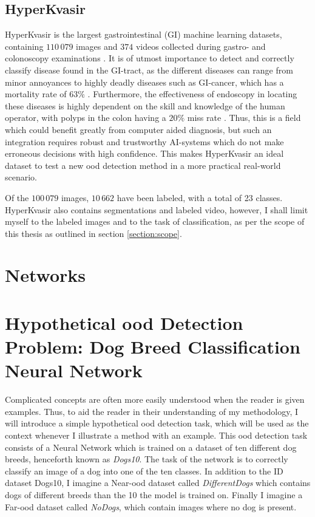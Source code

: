 \documentclass[UKenglish]{uiomasterthesis} %
\theoremstyle{definition}
\begin{document}
\subsection{HyperKvasir} \label{chapter:hyperkvasir}

HyperKvasir is the largest gastrointestinal (GI) machine learning datasets, containing $110 \,079$ images and $374$ videos collected during gastro- and colonoscopy examinations \cite{hyperkvasir}. It is of utmost importance to detect and correctly classify disease found in the GI-tract, as the different diseases can range from minor annoyances to highly deadly diseases such as GI-cancer, which has a mortality rate of $63 \%$ \cite{hyperkvasir}. Furthermore, the effectiveness of endoscopy in locating these diseases is highly dependent on the skill and knowledge of the human operator, with polyps in the colon having a $20 \%$ miss rate \cite{kaminski2010quality}. Thus, this is a field which could benefit greatly from computer aided diagnosis, but such an integration requires robust and trustworthy AI-systems which do not make erroneous decisions with high confidence. This makes HyperKvasir an ideal dataset to test a new \ac{ood} detection method in a more practical real-world scenario.

Of the $100 \, 079$ images, $10 \, 662$ have been labeled, with a total of 23 classes. HyperKvasir also contains segmentations and labeled video, however, I shall limit myself to the labeled images and to the task of classification, as per the scope of this thesis as outlined in section \ref{section:scope}.

\section{Networks}

\section{Hypothetical \ac{ood} Detection Problem: Dog Breed Classification Neural Network}

Complicated concepts are often more easily understood when the reader is given examples. Thus, to aid the reader in their understanding of my methodology, I will introduce a simple hypothetical \ac{ood} detection task, which will be used as the context whenever I illustrate a method with an example. This \ac{ood} detection task consists of a Neural Network which is trained on a dataset of ten different dog breeds, henceforth known as {\it Dogs10}. The task of the network is to correctly classify an image of a dog into one of the ten classes. In addition to the ID dataset Dogs10, I imagine a Near-\ac{ood} dataset called {\it DifferentDogs} which contains dogs of different breeds than the 10 the model is trained on. Finally I imagine a Far-\ac{ood} dataset called {\it NoDogs}, which contain images where no dog is present.
\end{document}
